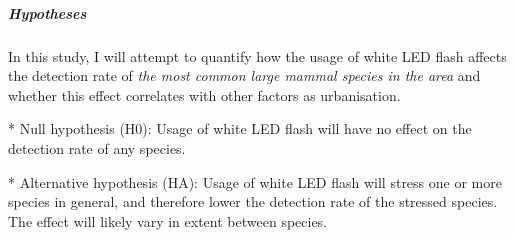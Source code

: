 \subparagraph{Hypotheses}
In this study, I will attempt to quantify how the usage of white LED flash affects the detection rate of \textsl{the most common large mammal species in the area} and whether this effect correlates with other factors as urbanisation.

* Null hypothesis (H0): Usage of white LED flash will have no effect on the detection rate of any species.

* Alternative hypothesis (HA): Usage of white LED flash will stress one or more species in general, and therefore lower the detection rate of the stressed species. The effect will likely vary in extent between species.



